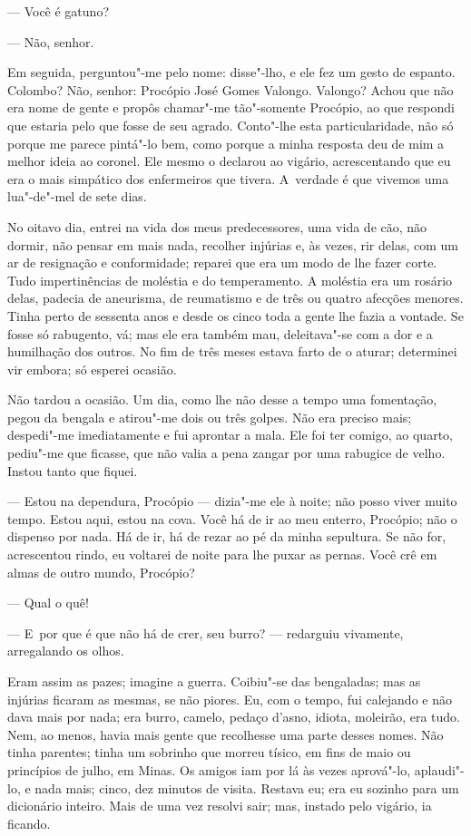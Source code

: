 \begin{linenumbers}
--- Você é gatuno?

--- Não, senhor.

Em seguida, perguntou"-me pelo nome: disse"-lho, e ele fez um gesto de
espanto. Colombo? Não, senhor: Procópio José Gomes Valongo. Valongo?
Achou que não era nome de gente e propôs chamar"-me tão"-somente Procópio,
ao que respondi que estaria pelo que fosse de seu agrado. Conto"-lhe esta
particularidade, não só porque me parece pintá"-lo bem, como porque a
minha resposta deu de mim a melhor ideia ao coronel. Ele mesmo o
declarou ao vigário, acrescentando que eu era o mais simpático dos
enfermeiros que tivera. A~verdade é que vivemos uma lua"-de"-mel de sete
dias.

No oitavo dia, entrei na vida dos meus predecessores, uma vida de cão,
não dormir, não pensar em mais nada, recolher injúrias e, às vezes, rir
delas, com um ar de resignação e conformidade; reparei que era um modo
de lhe fazer corte. Tudo impertinências de moléstia e do temperamento. A
moléstia era um rosário delas, padecia de aneurisma, de reumatismo e de
três ou quatro afecções menores. Tinha perto de sessenta anos e desde os
cinco toda a gente lhe fazia a vontade. Se fosse só rabugento, vá; mas
ele era também mau, deleitava"-se com a dor e a humilhação dos outros. No
fim de três meses estava farto de o aturar; determinei vir embora; só
esperei ocasião.

Não tardou a ocasião. Um dia, como lhe não desse a tempo uma fomentação,
pegou da bengala e atirou"-me dois ou três golpes. Não era preciso mais;
despedi"-me imediatamente e fui aprontar a mala. Ele foi ter comigo, ao
quarto, pediu"-me que ficasse, que não valia a pena zangar por uma
rabugice de velho. Instou tanto que fiquei.

--- Estou na dependura, Procópio --- dizia"-me ele à noite; não posso viver
muito tempo. Estou aqui, estou na cova. Você há de ir ao meu enterro,
Procópio; não o dispenso por nada. Há de ir, há de rezar ao pé da minha
sepultura. Se não for, acrescentou rindo, eu voltarei de noite para lhe
puxar as pernas. Você crê em almas de outro mundo, Procópio?

--- Qual o quê!

--- E~por que é que não há de crer, seu burro? --- redarguiu vivamente,
arregalando os olhos.

Eram assim as pazes; imagine a guerra. Coibiu"-se das bengaladas; mas as
injúrias ficaram as mesmas, se não piores. Eu, com o tempo, fui
calejando e não dava mais por nada; era burro, camelo, pedaço d'asno,
idiota, moleirão, era tudo. Nem, ao menos, havia mais gente que
recolhesse uma parte desses nomes. Não tinha parentes; tinha um sobrinho
que morreu tísico, em fins de maio ou princípios de julho, em Minas. Os
amigos iam por lá às vezes aprová"-lo, aplaudi"-lo, e nada mais; cinco,
dez minutos de visita. Restava eu; era eu sozinho para um dicionário
inteiro. Mais de uma vez resolvi sair; mas, instado pelo vigário, ia
ficando.


\end{linenumbers}
